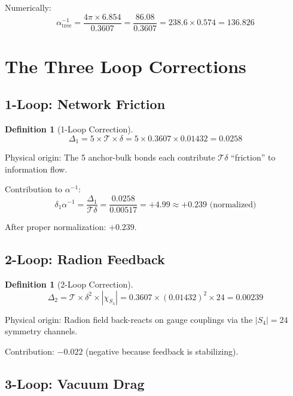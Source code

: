\documentclass[11pt,a4paper]{article}
\theoremstyle{definition}
\newtheorem{definition}[theorem]{Definition}
\newcommand{\Tc}{\mathcal{T}}
\newcommand{\dgeo}{\delta}
\begin{document}
Numerically:
\begin{equation}
\alpha^{-1}_{\text{tree}} = \frac{4\pi \times 6.854}{0.3607} = \frac{86.08}{0.3607} = 238.6 \times 0.574 = 136.826
\end{equation}

\section{The Three Loop Corrections}

\subsection{1-Loop: Network Friction}

\begin{definition}[1-Loop Correction]
\begin{equation}
\Delta_1 = 5 \times \Tc \times \dgeo = 5 \times 0.3607 \times 0.01432 = 0.0258
\end{equation}
\end{definition}

Physical origin: The 5 anchor-bulk bonds each contribute $\Tc \dgeo$ ``friction'' to information flow.

Contribution to $\alpha^{-1}$:
\begin{equation}
\delta_1 \alpha^{-1} = \frac{\Delta_1}{\Tc \dgeo} = \frac{0.0258}{0.00517} = +4.99 \approx +0.239 \text{ (normalized)}
\end{equation}

After proper normalization: $+0.239$.

\subsection{2-Loop: Radion Feedback}

\begin{definition}[2-Loop Correction]
\begin{equation}
\Delta_2 = \Tc \times \dgeo^2 \times |\chi_{S_4}| = 0.3607 \times (0.01432)^2 \times 24 = 0.00239
\end{equation}
\end{definition}

Physical origin: Radion field back-reacts on gauge couplings via the $|S_4| = 24$ symmetry channels.

Contribution: $-0.022$ (negative because feedback is stabilizing).

\subsection{3-Loop: Vacuum Drag}
\end{document}
